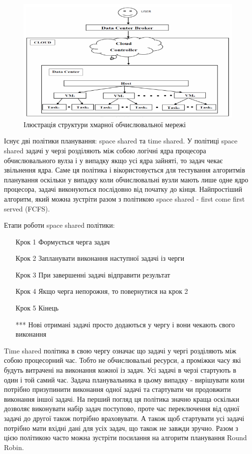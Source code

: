 \begin{figure}[H]
	\centering
	\includegraphics[width=\textwidth]{task_analysis/img/cloud_representation}
	\caption{Ілюстрація структури хмарної обчислювальної мережі}
	\label{fig:cloud_representation}
\end{figure}

Існує дві політики планування: space shared та time shared. У політиці space shared задачі у черзі розділяють між собою логічні ядра процесора обчислювального вулза і у випадку якщо усі ядра зайняті, то задач чекає звільнення ядра. Саме ця політика і вікористовується для тестування алгоритмів планування оскільки у випадку коли обчислювальні вузли мають лише одне ядро процесора, задачі виконуються послідовно від початку до кінця. Найпростіший алгоритм, який можна зустріти разом з політикою space shared - first come first served (FCFS).

Етапи роботи space shared політики:
\begin{itemize}
	\item[Крок 1] Формується черга задач
	\item[Крок 2] Запланувати виконання наступної задачі із черги
	\item[Крок 3] При завершенні задачі відправити результат
	\item[Крок 4] Якщо черга непорожня, то повернутися на крок 2
	\item[Крок 5] Кінець
	\item[***] Нові отримані задачі просто додаються у чергу і вони чекають свого виконання
\end{itemize}

Time shared політика в свою чергу означає що задачі у чергі розділяють між собою процесорний час. Тобто не обчислювальні ресурси, а проміжки часу які будуть витрачені на виконання кожної із задач. Усі задачі в черзі стартують в один і той самий час. Задача планувальника в цьому випадку - вирішувати коли потрібно призупинити виконання одної задачі та стартувати чи продовжити виконання іншої задачі. На перший погляд ця політика значно краща оскільки дозволяє виконувати набір задач поступово, проте час переключення від одної задачі до другої також потрібно враховувати. А також щоб стартувати усі задачі потрібно мати вхідні дані для усіх задач, що також не завжди зручно. Разом з цією політикою часто можна зустріти посилання на алгоритм планування Round Robin.

